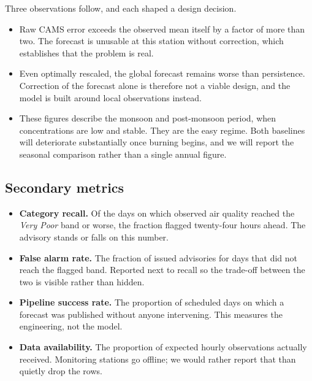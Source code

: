 \documentclass[11pt,a4paper]{article}
\begin{document}

\medskip
Three observations follow, and each shaped a design decision.

\begin{itemize}[leftmargin=0.7cm]
  \item Raw CAMS error exceeds the observed mean itself by a
    factor of more than two. The forecast is unusable at this
    station without correction, which establishes that the
    problem is real.
  \item Even optimally rescaled, the global forecast remains
    worse than persistence. Correction of the forecast alone is
    therefore not a viable design, and the model is built around
    local observations instead.
  \item These figures describe the monsoon and post-monsoon
    period, when concentrations are low and stable. They are the
    easy regime. Both baselines will deteriorate substantially
    once burning begins, and we will report the seasonal
    comparison rather than a single annual figure.
\end{itemize}

\subsection{Secondary metrics}
\begin{itemize}[leftmargin=0.7cm]
  \item \textbf{Category recall.} Of the days on which
    observed air quality reached the \emph{Very Poor}
    band or worse, the fraction flagged twenty-four
    hours ahead. The advisory stands or falls on this
    number.
  \item \textbf{False alarm rate.} The fraction of
    issued advisories for days that did not reach the
    flagged band. Reported next to recall so the
    trade-off between the two is visible rather than
    hidden.
  \item \textbf{Pipeline success rate.} The proportion
    of scheduled days on which a forecast was published
    without anyone intervening. This measures the
    engineering, not the model.
  \item \textbf{Data availability.} The proportion of
    expected hourly observations actually received.
    Monitoring stations go offline; we would rather
    report that than quietly drop the rows.
\end{itemize}
\end{document}
